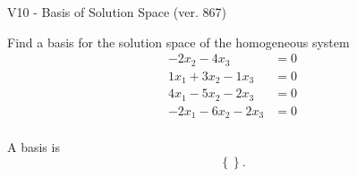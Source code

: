 \begin{exercise}
  \begin{exerciseTitle}V10 - Basis of Solution Space (ver. 867)\end{exerciseTitle}
  \begin{exerciseStatement}
    Find a basis for the solution space of the homogeneous system 
\begin{align*}
 -2 x_ 2 -4 x_ 3 &= 0  \\ 
  1 x_ 1 + 3 x_ 2 -1 x_ 3 &= 0  \\ 
  4 x_ 1 -5 x_ 2 -2 x_ 3 &= 0  \\ 
  -2 x_ 1 -6 x_ 2 -2 x_ 3 &= 0  \\ 
 \end{align*}


 
  \end{exerciseStatement}

  \begin{exerciseAnswer}
   A basis is   
\[\left\{\right\}.\]

  


  \end{exerciseAnswer}
\end{exercise}